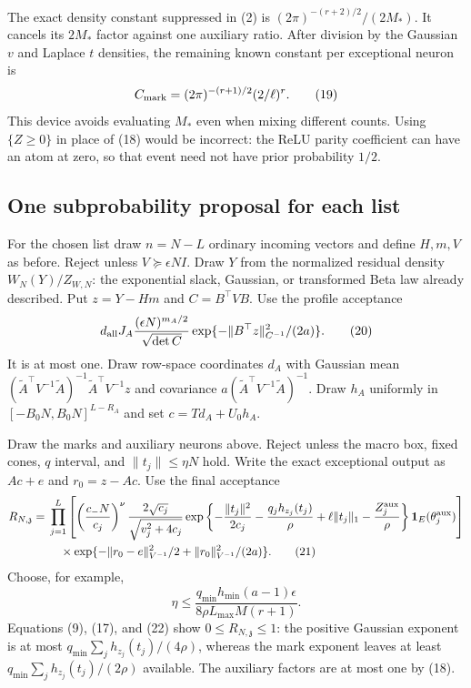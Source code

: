 \documentclass[11pt]{article}
\begin{document}
The exact density constant suppressed in (2) is
$(2\pi)^{-(r+2)/2}/(2M_*)$. It cancels its $2M_*$ factor against
one auxiliary ratio. After division by the Gaussian $v$ and Laplace
$t$ densities, the remaining known constant per exceptional neuron is
\[
                 C_{\rm mark}=(2\pi)^{-(r+1)/2}(2/\ell)^r.
                                                               \tag{19}
\]
This device avoids evaluating $M_*$ even when mixing different counts.
Using $\{Z\ge0\}$ in place of (18) would be incorrect: the ReLU
parity coefficient can have an atom at zero, so that event need not have
prior probability $1/2$.

\subsection{One subprobability proposal for each list}
For the chosen list draw $n=N-L$ ordinary incoming vectors and define
$H,m,V$ as before. Reject unless $V\succeq\epsilon NI$. Draw $Y$ from
the normalized residual density $W_N(Y)/Z_{W,N}$: the exponential slack,
Gaussian, or transformed Beta law already described. Put
$z=Y-Hm$ and $C=B^\top VB$. Use the profile acceptance
\[
 d_{\rm all}J_A\frac{(\epsilon N)^{m_A/2}}{\sqrt{\det C}}
   \exp\{-\|B^\top z\|_{C^{-1}}^2/(2a)\}.              \tag{20}
\]
It is at most one. Draw row-space coordinates $d_A$ with Gaussian mean
$(\widetilde A^\top V^{-1}\widetilde A)^{-1}
 \widetilde A^\top V^{-1}z$ and covariance
$a(\widetilde A^\top V^{-1}\widetilde A)^{-1}$.
Draw $h_A$ uniformly in $[-B_0N,B_0N]^{L-R_A}$ and set
$c=T d_A+U_0h_A$.

Draw the marks and auxiliary neurons above. Reject unless the macro box,
fixed cones, $q$ interval, and $\|t_j\|\le\eta N$ hold. Write the exact
exceptional output as $Ac+e$ and $r_0=z-Ac$. Use the final acceptance
\begin{align}
 R_{N,\mathfrak z}={}&
 \prod_{j=1}^L\left[
  \left(\frac{c_-N}{c_j}\right)^\nu
  \frac{2\sqrt{c_j}}{\sqrt{v_j^2+4c_j}}
  \exp\left\{-\frac{\|t_j\|^2}{2c_j}
           -\frac{q_jh_{z_j}(t_j)}\rho+\ell\|t_j\|_1
           -\frac{Z_j^{\rm aux}}\rho\right\}
  \mathbf1_{E}(\theta_j^{\rm aux})\right] \notag\\
 &\quad\times
 \exp\{-\|r_0-e\|_{V^{-1}}^2/2+\|r_0\|_{V^{-1}}^2/(2a)\}.
                                                               \tag{21}
\end{align}
Choose, for example,
\[
 \eta\le\frac{q_{\min}h_{\min}(a-1)\epsilon}
                  {8\rho L_{\max}M(r+1)}.              \tag{22}
\]
Equations (9), (17), and (22) show $0\le R_{N,\mathfrak z}\le1$:
the positive Gaussian exponent is at most
$q_{\min}\sum_jh_{z_j}(t_j)/(4\rho)$, whereas the mark exponent
leaves at least $q_{\min}\sum_jh_{z_j}(t_j)/(2\rho)$ available.
The auxiliary factors are at most one by (18).
\end{document}
